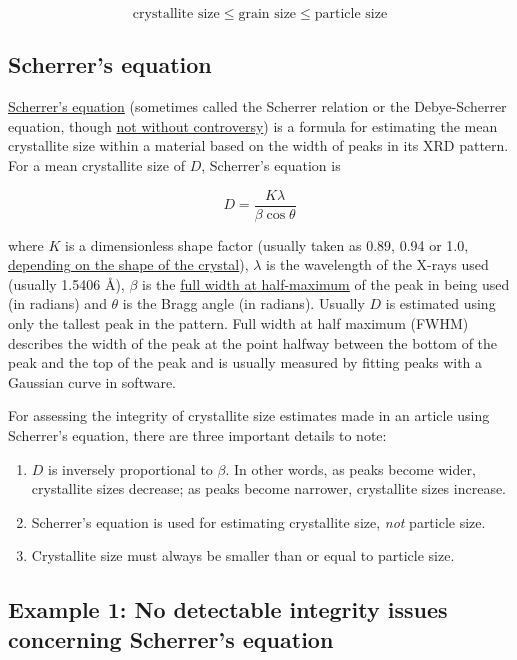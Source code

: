\documentclass[letterpaper, 12pt]{article}
\begin{document}
$$ \text{crystallite size} \leq \text{grain size} \leq \text{particle size}$$

\subsection*{Scherrer's equation}

\href{https://en.wikipedia.org/wiki/Scherrer_equation}{Scherrer's equation} (sometimes called the Scherrer relation or the Debye-Scherrer equation, though \href{https://doi.org/10.1038/nnano.2011.145}{not without controversy}) is a formula for estimating the mean crystallite size within a material based on the width of peaks in its XRD pattern. For a mean crystallite size of $D$, Scherrer's equation is

$$ D = \frac{K \lambda}{\beta \cos \theta} $$

where $K$ is a dimensionless shape factor (usually taken as 0.89, 0.94 or 1.0, \href{https://doi.org/10.1107/S0021889878012844}{depending on the shape of the crystal}), $\lambda$ is the wavelength of the X-rays used (usually 1.5406 \r{A}), $\beta$ is the \href{https://en.wikipedia.org/wiki/Full_width_at_half_maximum}{full width at half-maximum} of the peak in being used (in radians) and $\theta$ is the Bragg angle (in radians). Usually $D$ is estimated using only the tallest peak in the pattern. Full width at half maximum (FWHM) describes the width of the peak at the point halfway between the bottom of the peak and the top of the peak and is usually measured by fitting peaks with a Gaussian curve in software.

For assessing the integrity of crystallite size estimates made in an article using Scherrer's equation, there are three important details to note:

\begin{enumerate}
    \setlength\itemsep{-0.5em}
    \item $D$ is inversely proportional to $\beta$. In other words, as peaks become wider, crystallite sizes decrease; as peaks become narrower, crystallite sizes increase.
    \item Scherrer's equation is used for estimating crystallite size, \textit{not} particle size.
    \item Crystallite size must always be smaller than or equal to particle size.
\end{enumerate}

\subsection*{Example 1: No detectable integrity issues concerning Scherrer's equation}
\end{document}
